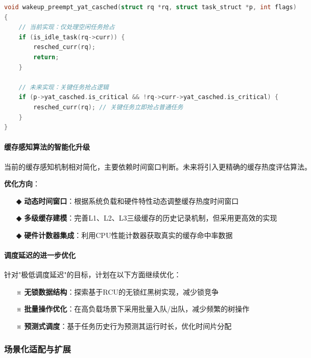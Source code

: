 \begin{lstlisting}[language=C, basicstyle=\small\ttfamily, caption={关键任务抢占逻辑设计}]
void wakeup_preempt_yat_casched(struct rq *rq, struct task_struct *p, int flags)
{
    // 当前实现：仅处理空闲任务抢占
    if (is_idle_task(rq->curr)) {
        resched_curr(rq);
        return;
    }
    
    // 未来实现：关键任务抢占逻辑
    if (p->yat_casched.is_critical && !rq->curr->yat_casched.is_critical) {
        resched_curr(rq); // 关键任务立即抢占普通任务
    }
}
\end{lstlisting}

\paragraph{缓存感知算法的智能化升级}

当前的缓存感知机制相对简化，主要依赖时间窗口判断。未来将引入更精确的缓存热度评估算法。

\textbf{优化方向}：
\begin{itemize}
    \item[◆] \textbf{动态时间窗口}：根据系统负载和硬件特性动态调整缓存热度时间窗口
    \item[◆] \textbf{多级缓存建模}：完善L1、L2、L3三级缓存的历史记录机制，但采用更高效的实现
    \item[◆] \textbf{硬件计数器集成}：利用CPU性能计数器获取真实的缓存命中率数据
\end{itemize}

\paragraph{调度延迟的进一步优化}

针对"极低调度延迟"的目标，计划在以下方面继续优化：

\begin{itemize}
    \item[※] \textbf{无锁数据结构}：探索基于RCU的无锁红黑树实现，减少锁竞争
    \item[※] \textbf{批量操作优化}：在高负载场景下采用批量入队/出队，减少频繁的树操作
    \item[※] \textbf{预测式调度}：基于任务历史行为预测其运行时长，优化时间片分配
\end{itemize}

\subsubsection{场景化适配与扩展}

